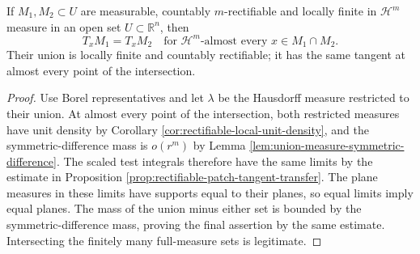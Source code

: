 \begin{corollary}\label{cor:rectifiable-common-tangents}
If $M_1,M_2\subset U$ are measurable, countably $m$-rectifiable and locally finite in $\mathcal H^m$ measure in an open set $U\subset\mathbb R^n$, then
\[
 T_xM_1=T_xM_2
 \quad\text{for }\mathcal H^m\text{-almost every }x\in M_1\cap M_2.
\]
Their union is locally finite and countably rectifiable; it has the same tangent at almost every point of the intersection.
\end{corollary}
\begin{proof}
Use Borel representatives and let $\lambda$ be the Hausdorff measure restricted to their union. At almost every point of the intersection, both restricted measures have unit density by Corollary \ref{cor:rectifiable-local-unit-density}, and the symmetric-difference mass is $o(r^m)$ by Lemma \ref{lem:union-measure-symmetric-difference}. The scaled test integrals therefore have the same limits by the estimate in Proposition \ref{prop:rectifiable-patch-tangent-transfer}. The plane measures in these limits have supports equal to their planes, so equal limits imply equal planes. The mass of the union minus either set is bounded by the symmetric-difference mass, proving the final assertion by the same estimate. Intersecting the finitely many full-measure sets is legitimate.
\end{proof}
